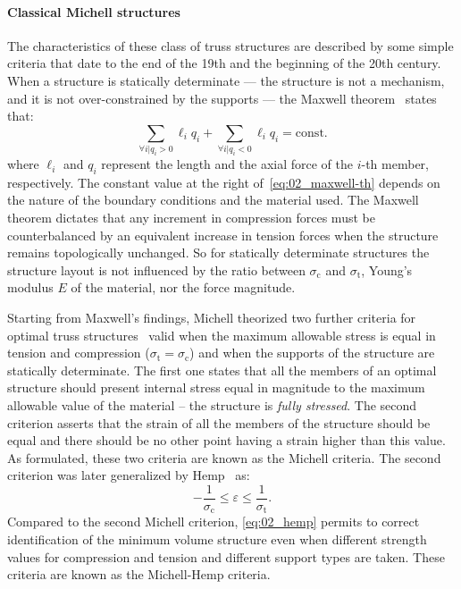 \paragraph{Classical Michell structures} \label{sec:02_michell}
The characteristics of these class of truss structures are described by some simple criteria that date to the end of the 19th and the beginning of the 20th century. When a structure is statically determinate — \ie the structure is not a mechanism, and it is not over-constrained by the supports — the Maxwell theorem~ states that:
\begin{equation} \label{eq:02_maxwell-th}
    \sum_{\forall i | q_i>0}\ell_iq_i + \sum_{\forall i | q_i<0}\ell_iq_i = \textrm{const.}
\end{equation}
where $\ell_i$ and $q_i$ represent the length and the axial force of the $i$-th member, respectively. The constant value at the right of~\eqref{eq:02_maxwell-th} depends on the nature of the boundary conditions and the material used. The Maxwell theorem dictates that any increment in compression forces must be counterbalanced by an equivalent increase in tension forces when the structure remains topologically unchanged. So for statically determinate structures the structure layout is not influenced by the ratio between $\sigma_\text{c}$ and $\sigma_\text{t}$, Young's modulus $E$ of the material, nor the force magnitude.

Starting from Maxwell's findings, Michell theorized two further criteria for optimal truss structures~ valid when the maximum allowable stress is equal in tension and compression ($\sigma_\text{t} = \sigma_\text{c}$) and when the supports of the structure are statically determinate. The first one states that all the members of an optimal structure should present internal stress equal in magnitude to the maximum allowable value of the material -- \ie the structure is \textit{fully stressed}. The second criterion asserts that the strain of all the members of the structure should be equal and there should be no other point having a strain higher than this value. As formulated, these two criteria are known as the Michell criteria. The second criterion was later generalized by Hemp~ as:
\begin{equation} \label{eq:02_hemp}
    -\frac{1}{\sigma_\text{c}}\leq \varepsilon \leq \frac{1}{\sigma_\text{t}}.
\end{equation}
Compared to the second Michell criterion, \eqref{eq:02_hemp} permits to correct identification of the minimum volume structure even when different strength values for compression and tension and different support types are taken. These criteria are known as the Michell-Hemp criteria.

